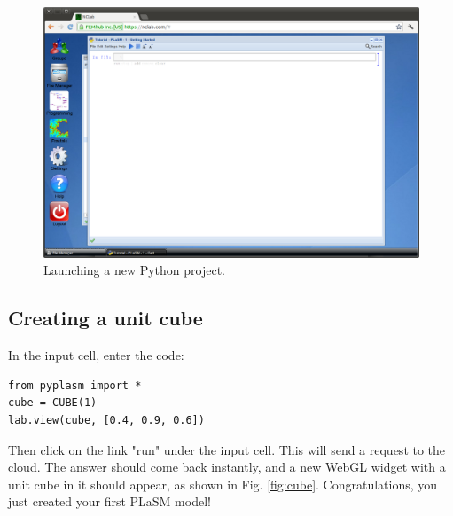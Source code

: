 \documentclass[article,A4,12pt]{llncs}
\begin{document}
\begin{figure}[!ht]
\begin{center}
\includegraphics[width=\textwidth]{img/python.png}
\end{center}
\caption{Launching a new Python project.}
\label{fig:python}
\end{figure}
\noindent



\subsection{Creating a unit cube}

In the input cell, enter the code:

\begin{verbatim}
from pyplasm import *
cube = CUBE(1)
lab.view(cube, [0.4, 0.9, 0.6])
\end{verbatim}
Then click on the link "run" under the input cell. This will send a request 
to the cloud. The answer should come back instantly, and a new WebGL widget 
with a unit cube in it should appear, as shown in Fig. \ref{fig:cube}. 
Congratulations, you just created your first PLaSM model!
\end{document}
